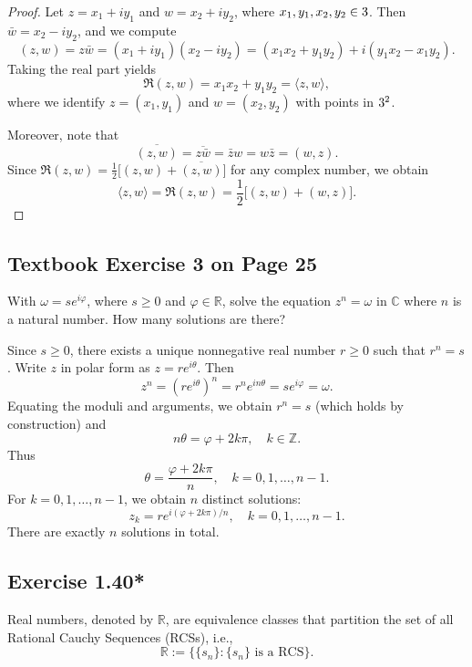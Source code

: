 \documentclass{article}
\begin{document}
\begin{proof}
  Let $z = x_1 + i y_1$ and $w = x_2 + i y_2$, where $x_1, y_1, x_2,
  y_2 \in 3$.
  Then $\bar{w} = x_2 - i y_2$, and we compute
  \[
    (z, w) = z\bar{w} = (x_1 + i y_1)(x_2 - i y_2)
    = (x_1 x_2 + y_1 y_2) + i (y_1 x_2 - x_1 y_2).
  \]
  Taking the real part yields
  \[
    \Re(z, w) = x_1 x_2 + y_1 y_2 = \langle z, w \rangle,
  \]
  where we identify $z = (x_1, y_1)$ and $w = (x_2, y_2)$ with points in $3^2$.

  Moreover, note that
  \[
    \overline{(z, w)} = \overline{z\bar{w}} = \bar{z}w = w\bar{z} = (w, z).
  \]
  Since $\Re(z, w) = \frac{1}{2}\big[(z, w) + \overline{(z, w)}\big]$
  for any complex number,
  we obtain
  \[
    \langle z, w \rangle = \Re(z, w)
    = \frac{1}{2}\big[(z, w) + (w, z)\big].
  \]
\end{proof}

\subsection{Textbook Exercise 3 on Page 25}

With $\omega = s e^{i\varphi}$, where $s \geq 0$ and $\varphi \in
\mathbb{R}$, solve the equation $z^n = \omega$ in $\mathbb{C}$ where
$n$ is a natural number. How many solutions are there?

\begin{solution}
  Since $s \ge 0$, there exists a unique nonnegative real number $r \ge 0$
  such that $r^n = s$. Write $z$ in polar form as $z = r e^{i\theta}$.
  Then
  \[
    z^n = (r e^{i\theta})^n = r^n e^{in\theta} = s e^{i\varphi} = \omega.
  \]
  Equating the moduli and arguments, we obtain $r^n = s$ (which holds by
  construction) and
  \[
    n\theta = \varphi + 2k\pi, \quad k \in \mathbb{Z}.
  \]
  Thus
  \[
    \theta = \frac{\varphi + 2k\pi}{n}, \quad k = 0, 1, \dots, n-1.
  \]
  For $k = 0, 1, \dots, n-1$, we obtain $n$ distinct solutions:
  \[
    z_k = r e^{i(\varphi + 2k\pi)/n}, \quad k = 0, 1, \dots, n-1.
  \]
  There are exactly $n$ solutions in total.
\end{solution}

\subsection{Exercise 1.40*}

\begin{definition}
  Real numbers, denoted by $\mathbb{R}$, are equivalence classes that
  partition the set of all Rational Cauchy Sequences (RCSs), i.e.,
  \[
    \mathbb{R} := \{ \{s_n\} : \{s_n\} \text{ is a RCS} \}.
  \]
\end{definition}
\end{document}
